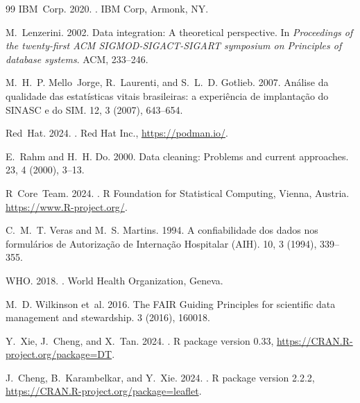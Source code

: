 \documentclass[sigconf, nonacm, screen, language=portuguese, language=spanish, language={main=english}]{acmart}
\begin{document}
\begin{thebibliography}{99}
IBM~Corp. 2020.
.
\newblock IBM Corp, Armonk, NY.

M.~Lenzerini. 2002.
\newblock Data integration: A theoretical perspective.
\newblock In {\em Proceedings of the twenty-first ACM SIGMOD-SIGACT-SIGART symposium on Principles of database systems}. ACM, 233--246.

M.~H.~P. Mello~Jorge, R.~Laurenti, and S.~L.~D. Gotlieb. 2007.
\newblock Análise da qualidade das estatísticas vitais brasileiras: a experiência de implantação do SINASC e do SIM.
 12, 3 (2007), 643--654.

Red~Hat. 2024.
.
\newblock Red Hat Inc., \url{https://podman.io/}.

E.~Rahm and H.~H. Do. 2000.
\newblock Data cleaning: Problems and current approaches.
 23, 4 (2000), 3--13.

R~Core~Team. 2024.
.
\newblock R Foundation for Statistical Computing, Vienna, Austria. \url{https://www.R-project.org/}.

C.~M.~T. Veras and M.~S. Martins. 1994.
\newblock A confiabilidade dos dados nos formulários de Autorização de Internação Hospitalar (AIH).
 10, 3 (1994), 339--355.

WHO. 2018.
.
\newblock World Health Organization, Geneva.

M.~D. Wilkinson et~al. 2016.
\newblock The FAIR Guiding Principles for scientific data management and stewardship.
 3 (2016), 160018.

Y.~Xie, J.~Cheng, and X.~Tan. 2024.
.
\newblock R package version 0.33, \url{https://CRAN.R-project.org/package=DT}.

J.~Cheng, B.~Karambelkar, and Y.~Xie. 2024.
.
\newblock R package version 2.2.2, \url{https://CRAN.R-project.org/package=leaflet}.

\end{thebibliography}
\end{document}
